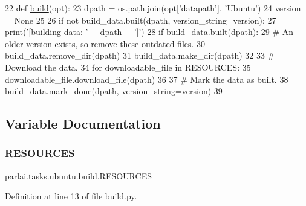 \begin{DoxyCode}
22 \textcolor{keyword}{def }\hyperlink{namespacedialog__babi__feedback_1_1build_a7a9d289f7493a5ded13c4b7f071b6184}{build}(opt):
23     dpath = os.path.join(opt[\textcolor{stringliteral}{'datapath'}], \textcolor{stringliteral}{'Ubuntu'})
24     version = \textcolor{keywordtype}{None}
25 
26     \textcolor{keywordflow}{if} \textcolor{keywordflow}{not} build\_data.built(dpath, version\_string=version):
27         print(\textcolor{stringliteral}{'[building data: '} + dpath + \textcolor{stringliteral}{']'})
28         \textcolor{keywordflow}{if} build\_data.built(dpath):
29             \textcolor{comment}{# An older version exists, so remove these outdated files.}
30             build\_data.remove\_dir(dpath)
31         build\_data.make\_dir(dpath)
32 
33         \textcolor{comment}{# Download the data.}
34         \textcolor{keywordflow}{for} downloadable\_file \textcolor{keywordflow}{in} RESOURCES:
35             downloadable\_file.download\_file(dpath)
36 
37         \textcolor{comment}{# Mark the data as built.}
38         build\_data.mark\_done(dpath, version\_string=version)
39 \end{DoxyCode}


\subsection{Variable Documentation}
\mbox{\label{namespaceparlai_1_1tasks_1_1ubuntu_1_1build_a98e8e58fda312364152e973761329a10}} 
\subsubsection{\texorpdfstring{R\+E\+S\+O\+U\+R\+C\+ES}{RESOURCES}}
{\footnotesize\ttfamily parlai.\+tasks.\+ubuntu.\+build.\+R\+E\+S\+O\+U\+R\+C\+ES}



Definition at line 13 of file build.\+py.

